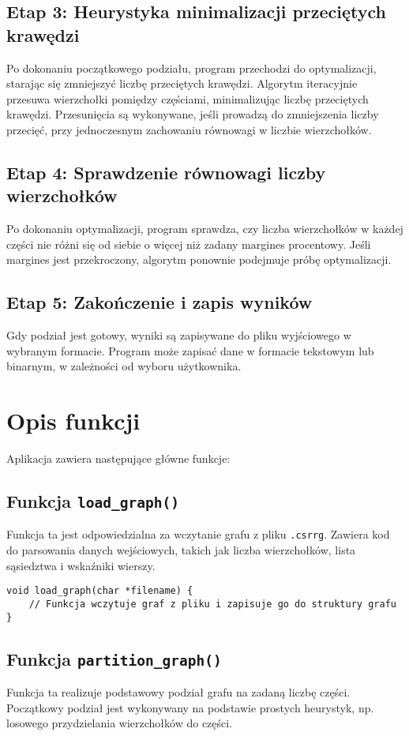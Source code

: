 \documentclass[a4paper,12pt]{article}
\begin{document}
\subsection{Etap 3: Heurystyka minimalizacji przeciętych krawędzi}
Po dokonaniu początkowego podziału, program przechodzi do optymalizacji, starając się zmniejszyć liczbę przeciętych krawędzi. Algorytm iteracyjnie przesuwa wierzchołki pomiędzy częściami, minimalizując liczbę przeciętych krawędzi. Przesunięcia są wykonywane, jeśli prowadzą do zmniejszenia liczby przecięć, przy jednoczesnym zachowaniu równowagi w liczbie wierzchołków.

\subsection{Etap 4: Sprawdzenie równowagi liczby wierzchołków}
Po dokonaniu optymalizacji, program sprawdza, czy liczba wierzchołków w każdej części nie różni się od siebie o więcej niż zadany margines procentowy. Jeśli margines jest przekroczony, algorytm ponownie podejmuje próbę optymalizacji.

\subsection{Etap 5: Zakończenie i zapis wyników}
Gdy podział jest gotowy, wyniki są zapisywane do pliku wyjściowego w wybranym formacie. Program może zapisać dane w formacie tekstowym lub binarnym, w zależności od wyboru użytkownika.

\section{Opis funkcji}

Aplikacja zawiera następujące główne funkcje:

\subsection{Funkcja \texttt{load\_graph()}}
Funkcja ta jest odpowiedzialna za wczytanie grafu z pliku \texttt{.csrrg}. Zawiera kod do parsowania danych wejściowych, takich jak liczba wierzchołków, lista sąsiedztwa i wskaźniki wierszy.

\begin{verbatim}
void load_graph(char *filename) {
    // Funkcja wczytuje graf z pliku i zapisuje go do struktury grafu
}
\end{verbatim}

\subsection{Funkcja \texttt{partition\_graph()}}
Funkcja ta realizuje podstawowy podział grafu na zadaną liczbę części. Początkowy podział jest wykonywany na podstawie prostych heurystyk, np. losowego przydzielania wierzchołków do części.
\end{document}
